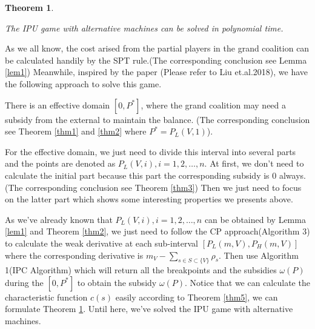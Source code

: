 \documentclass[UTF8]{article}
\newtheorem{thm}{\hspace{2em}Theorem}
\begin{document}
\begin{thm}\label{thm6}

The IPU game with alternative machines can be solved in polynomial time.

\end{thm}


As we all know, the cost arised from the partial players in the grand coalition can be calculated handily by the SPT rule.(The corresponding conclusion see Lemma \ref{lem1}) Meanwhile, inspired by the paper (Please refer to Liu et.al.2018), we have the following approach to solve this game.


There is an effective domain $[0, P^*]$, where the grand coalition may need a subsidy from the external to maintain the balance.
(The corresponding conclusion see Theorem \ref{thm1} and \ref{thm2} where $P^* = P_L(V,1)$).


For the effective domain, we just need to divide this interval into several parts and the points are denoted as $P_L(V,i), i = 1,2,\ldots,n$.  At first, we don't need to calculate the initial part because this part the corresponding subsidy is 0 always.(The corresponding conclusion see Theorem \ref{thm3}) Then we just need to focus on the latter part which shows some interesting properties we presents above.


As we've already known that $P_L(V,i), i = 1,2,\ldots,n$ can be obtained by Lemma \ref{lem1} and Theorem \ref{thm2}, we just need to follow the CP approach(Algorithm 3) to calculate the weak derivative at each sub-interval $[P_L(m,V),P_H(m,V)]$ where the corresponding derivative is $m_V-\sum_{s\in S\subset\{V\}} \rho_s$.
Then use Algorithm 1(IPC Algorithm) which will return all the breakpoints and the subsidies $\omega(P)$ during the $[0, P^*]$ to obtain the subsidy $\omega(P)$. Notice that we can calculate the characteristic function $c(s)$ easily according to Theorem \ref{thm5}, we can formulate Theorem \ref{thm6}. Until here, we've solved the IPU game with alternative machines.
\end{document}
